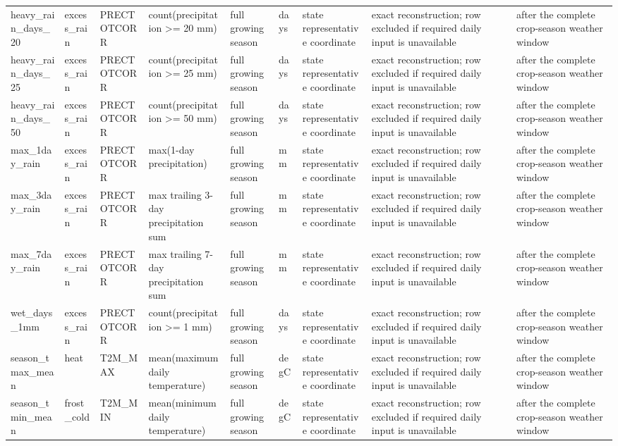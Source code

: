 \begin{tabular}{p{}p{}p{}p{}p{}p{}p{}p{}p{}}
heavy\_rain\_days\_20 & excess\_rain & PRECTOTCORR & count(precipitation >= 20 mm) & full growing season & days & state representative coordinate & exact reconstruction; row excluded if required daily input is unavailable & after the complete crop-season weather window \\
heavy\_rain\_days\_25 & excess\_rain & PRECTOTCORR & count(precipitation >= 25 mm) & full growing season & days & state representative coordinate & exact reconstruction; row excluded if required daily input is unavailable & after the complete crop-season weather window \\
heavy\_rain\_days\_50 & excess\_rain & PRECTOTCORR & count(precipitation >= 50 mm) & full growing season & days & state representative coordinate & exact reconstruction; row excluded if required daily input is unavailable & after the complete crop-season weather window \\
max\_1day\_rain & excess\_rain & PRECTOTCORR & max(1-day precipitation) & full growing season & mm & state representative coordinate & exact reconstruction; row excluded if required daily input is unavailable & after the complete crop-season weather window \\
max\_3day\_rain & excess\_rain & PRECTOTCORR & max trailing 3-day precipitation sum & full growing season & mm & state representative coordinate & exact reconstruction; row excluded if required daily input is unavailable & after the complete crop-season weather window \\
max\_7day\_rain & excess\_rain & PRECTOTCORR & max trailing 7-day precipitation sum & full growing season & mm & state representative coordinate & exact reconstruction; row excluded if required daily input is unavailable & after the complete crop-season weather window \\
wet\_days\_1mm & excess\_rain & PRECTOTCORR & count(precipitation >= 1 mm) & full growing season & days & state representative coordinate & exact reconstruction; row excluded if required daily input is unavailable & after the complete crop-season weather window \\
season\_tmax\_mean & heat & T2M\_MAX & mean(maximum daily temperature) & full growing season & degC & state representative coordinate & exact reconstruction; row excluded if required daily input is unavailable & after the complete crop-season weather window \\
season\_tmin\_mean & frost\_cold & T2M\_MIN & mean(minimum daily temperature) & full growing season & degC & state representative coordinate & exact reconstruction; row excluded if required daily input is unavailable & after the complete crop-season weather window \\

\end{tabular}
